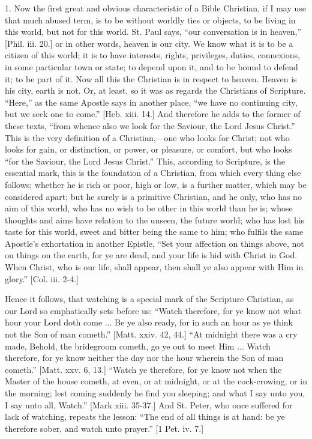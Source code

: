 1. Now the first great and obvious characteristic of a Bible
Christian, if I may use that much abused term, is to be without
worldly ties or objects, to be living in this world, but not for this
world. St. Paul says, ``our conversation is in heaven,''
[Phil. iii. 20.] or in other words, heaven is our city. We know what
it is to be a citizen of this world; it is to have interests, rights,
privileges, duties, connexions, in some particular town or state; to
depend upon it, and to be bound to defend it; to be part of it. Now
all this the Christian is in respect to heaven. Heaven is his city,
earth is not. Or, at least, so it was as regards the Christians of
Scripture. ``Here,'' as the same Apostle says in another
place, ``we have no continuing city, but we seek one to
come.'' [Heb. xiii. 14.] And therefore he adds to the former of
these texts, ``from whence also we look for the Saviour, the Lord
Jesus Christ.'' This is the very definition of a Christian,—one
who looks for Christ; not who looks for gain, or distinction, or
power, or pleasure, or comfort, but who looks ``for the Saviour,
the Lord Jesus Christ.'' This, according to Scripture, is the
essential mark, this is the foundation of a Christian, from which
every thing else follows; whether he is rich or poor, high or low, is
a further matter, which may be considered apart; but he surely is a
primitive Christian, and he only, who has no aim of this world, who
has no wish to be other in this world than he is; whose thoughts and
aims have relation to the unseen, the future world; who has lost his
taste for this world, sweet and bitter being the same to him; who
fulfils the same Apostle's exhortation in another Epistle, ``Set
your affection on things above, not on things on the earth, for ye are
dead, and your life is hid with Christ in God. When Christ, who is our
life, shall appear, then shall ye also appear with Him in glory.''
[Col. iii. 2-4.]

Hence it follows, that watching is a special mark of the Scripture
Christian, as our Lord so emphatically sets before us: ``Watch
therefore, for ye know not what hour your Lord doth come ... Be ye
also ready, for in such an hour as ye think not the Son of man
cometh.'' [Matt. xxiv. 42, 44.] ``At midnight there was a cry
made, Behold, the bridegroom cometh, go ye out to meet Him ... Watch
therefore, for ye know neither the day nor the hour wherein the Son of
man cometh.'' [Matt. xxv. 6, 13.] ``Watch ye therefore, for ye
know not when the Master of the house cometh, at even, or at midnight,
or at the cock-crowing, or in the morning; lest coming suddenly he
find you sleeping; and what I say unto you, I say unto all,
Watch.'' [Mark xiii. 35-37.] And St. Peter, who once suffered for
lack of watching, repeats the lesson: ``The end of all things is
at hand: be ye therefore sober, and watch unto prayer.'' [1 Pet.
iv. 7.]

